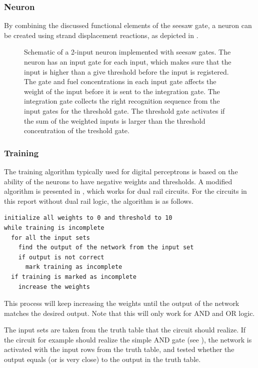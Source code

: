 \subsubsection{Neuron}
By combining the discussed functional elements of the seesaw gate, a neuron can be created using strand displacement reactions, as depicted in .

\begin{figure}[H]
    \centering
{} {

}
\caption{Schematic of a 2-input neuron implemented with seesaw gates. The neuron has an input gate for each input, which makes sure that the input is higher than a give threshold before the input is registered. The gate and fuel concentrations in each input gate affects the weight of the input before it is sent to the integration gate. The integration gate collects the right recognition sequence from the input gates for the threshold gate. The threshold gate activates if the sum of the weighted inputs is larger than the threshold concentration of the treshold gate.}
\label{seesaw_neuron}
\end{figure}



\subsubsection{Training}
The training algorithm typically used for digital perceptrons is based on the ability of the neurons to have negative weights and thresholds. A modified algorithm is presented in \cite{Qian2011}, which works for dual rail circuits. For the circuits in this report without dual rail logic, the algorithm is as follows.

\begin{lstlisting}
initialize all weights to 0 and threshold to 10
while training is incomplete
  for all the input sets
    find the output of the network from the input set
    if output is not correct
      mark training as incomplete
  if training is marked as incomplete
    increase the weights
\end{lstlisting}

This process will keep increasing the weights until the output of the network matches the desired output. Note that this will only work for AND and OR logic.

The input sets are taken from the truth table that the circuit should realize. If the circuit for example should realize the simple AND gate (see ), the network is activated with the input rows from the truth table, and tested whether the output equals (or is very close) to the output in the truth table.

